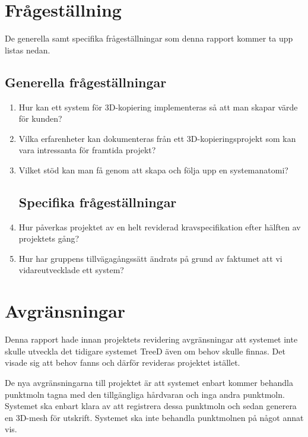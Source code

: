 \section{Frågeställning}
\label{sec:research-questions}
De generella samt specifika frågeställningar som denna rapport kommer ta upp listas nedan.

\subsection{Generella frågeställningar}

\begin{enumerate}
	\item Hur kan ett system för 3D-kopiering implementeras så att man skapar värde för kunden?
	\item Vilka erfarenheter kan dokumenteras från ett 3D-kopieringsprojekt som kan vara intressanta för framtida projekt?
	\item Vilket stöd kan man få genom att skapa och följa upp en systemanatomi?
	
\subsection{Specifika frågeställningar}

	\item Hur påverkas projektet av en helt reviderad kravspecifikation efter hälften av projektets gång?
	\item Hur har gruppens tillvägagångssätt ändrats på grund av faktumet att vi vidareutvecklade ett system? 
	
\end{enumerate}

\section{Avgränsningar}
\label{sec:delimitations}
Denna rapport hade innan projektets revidering avgränsningar att systemet inte skulle utveckla det tidigare systemet TreeD även om behov skulle finnas. Det visade sig att behov fanns och därför revideras projektet istället.

De nya avgränsningarna till projektet är att systemet enbart kommer behandla punktmoln tagna med den tillgängliga hårdvaran och inga andra punktmoln. Systemet ska enbart klara av att registrera dessa punktmoln och sedan generera en 3D-mesh för utskrift. Systemet ska inte behandla punktmolnen på något annat vis.

